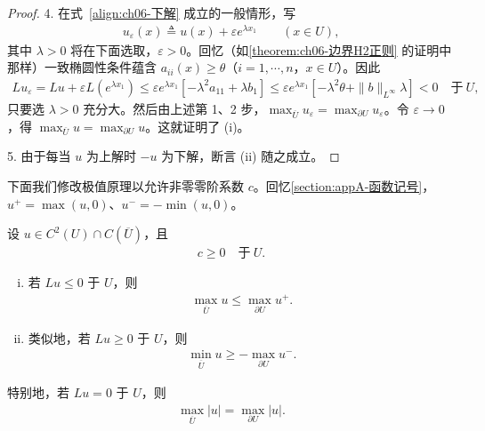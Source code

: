 \documentclass[../../main.tex]{subfiles}
\begin{document}
\begin{proof}
4. 在式~\eqref{align:ch06-下解} 成立的一般情形，写
\begin{align*}
u_{\varepsilon}(x)\triangleq u(x)+\varepsilon e^{\lambda x_{1}}\qquad (x\in U),
\end{align*}
其中 $\lambda>0$ 将在下面选取，$\varepsilon>0$。回忆（如\cref{theorem:ch06-边界H2正则} 的证明中那样）一致椭圆性条件蕴含 $a_{ii}(x)\geqslant\theta$（$i=1,\cdots,n$，$x\in U$）。因此
\begin{align*}
Lu_{\varepsilon}=Lu+\varepsilon L(e^{\lambda x_{1}})
\leqslant\varepsilon e^{\lambda x_{1}}[-\lambda^{2}a_{11}+\lambda b_{1}]
\leqslant\varepsilon e^{\lambda x_{1}}[-\lambda^{2}\theta+\|b\|_{L^{\infty}}\lambda]
<0\quad\text{于}\ U,
\end{align*}
只要选 $\lambda>0$ 充分大。然后由上述第 1、2 步，$\max_{\overline{U}}u_{\varepsilon}=\max_{\partial U}u_{\varepsilon}$。令 $\varepsilon\to 0$，得 $\max_{\overline{U}}u=\max_{\partial U}u$。这就证明了 (i)。

5. 由于每当 $u$ 为上解时 $-u$ 为下解，断言 (ii) 随之成立。
\end{proof}

下面我们修改极值原理以允许非零零阶系数 $c$。回忆\cref{section:appA-函数记号}，$u^{+}=\max(u,0)$、$u^{-}=-\min(u,0)$。

\begin{theorem}\label{theorem:ch06-c非负弱极值}设 $u\in C^{2}(U)\cap C(\overline{U})$，且
\begin{align*}
c\geqslant 0\quad\text{于}\ U.
\end{align*}
\begin{enumerate}[(i)]
\item 若 $Lu\leqslant 0$ 于 $U$，则
\begin{align}
\max_{\overline{U}}u\leqslant\max_{\partial U}u^{+}.
\end{align}
\item 类似地，若 $Lu\geqslant 0$ 于 $U$，则
\begin{align}
\min_{\overline{U}}u\geqslant-\max_{\partial U}u^{-}.
\end{align}
\end{enumerate}
\end{theorem}

\begin{remark}\label{remark:ch06-c非负弱极值注}
特别地，若 $Lu=0$ 于 $U$，则
\begin{align}
\max_{\overline{U}}|u|=\max_{\partial U}|u|.
\end{align}
\end{remark}
\end{document}
